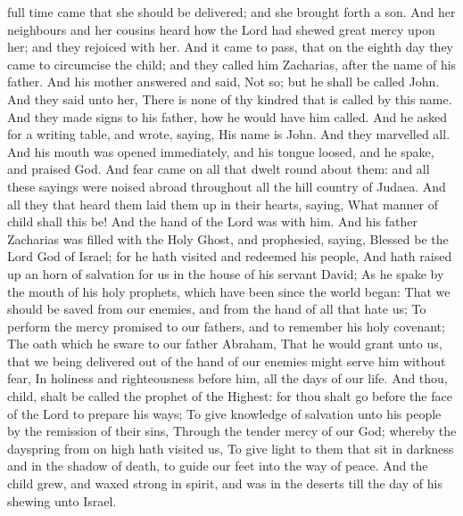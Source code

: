  full time came that she should be delivered; and she brought forth a son. And her neighbours and her cousins heard how the Lord had shewed great mercy upon her; and they rejoiced with her. And it came to pass, that on the eighth day they came to circumcise the child; and they called him Zacharias, after the name of his father. And his mother answered and said, Not so; but he shall be called John. And they said unto her, There is none of thy kindred that is called by this name. And they made signs to his father, how he would have him called. And he asked for a writing table, and wrote, saying, His name is John. And they marvelled all. And his mouth was opened immediately, and his tongue loosed, and he spake, and praised God. And fear came on all that dwelt round about them: and all these sayings were noised abroad throughout all the hill country of Judaea. And all they that heard them laid them up in their hearts, saying, What manner of child shall this be! And the hand of the Lord was with him. And his father Zacharias was filled with the Holy Ghost, and prophesied, saying, Blessed be the Lord God of Israel; for he hath visited and redeemed his people, And hath raised up an horn of salvation for us in the house of his servant David; As he spake by the mouth of his holy prophets, which have been since the world began: That we should be saved from our enemies, and from the hand of all that hate us; To perform the mercy promised to our fathers, and to remember his holy covenant; The oath which he sware to our father Abraham, That he would grant unto us, that we being delivered out of the hand of our enemies might serve him without fear, In holiness and righteousness before him, all the days of our life. And thou, child, shalt be called the prophet of the Highest: for thou shalt go before the face of the Lord to prepare his ways; To give knowledge of salvation unto his people by the remission of their sins, Through the tender mercy of our God; whereby the dayspring from on high hath visited us, To give light to them that sit in darkness and in the shadow of death, to guide our feet into the way of peace. And the child grew, and waxed strong in spirit, and was in the deserts till the day of his shewing unto Israel.

